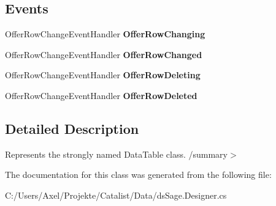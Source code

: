 \subsection*{Events}
\begin{DoxyCompactItemize}
\item 
Offer\+Row\+Change\+Event\+Handler {\bfseries Offer\+Row\+Changing}\hypertarget{class_products_1_1_data_1_1ds_sage_1_1_offer_data_table_aec11aca7c7bd800be51db3fc4bd370c2}{}\label{class_products_1_1_data_1_1ds_sage_1_1_offer_data_table_aec11aca7c7bd800be51db3fc4bd370c2}

\item 
Offer\+Row\+Change\+Event\+Handler {\bfseries Offer\+Row\+Changed}\hypertarget{class_products_1_1_data_1_1ds_sage_1_1_offer_data_table_a1ee914101e3ee41740189d86991a8996}{}\label{class_products_1_1_data_1_1ds_sage_1_1_offer_data_table_a1ee914101e3ee41740189d86991a8996}

\item 
Offer\+Row\+Change\+Event\+Handler {\bfseries Offer\+Row\+Deleting}\hypertarget{class_products_1_1_data_1_1ds_sage_1_1_offer_data_table_a42a0b640f7d907e891142fb1768a2b9b}{}\label{class_products_1_1_data_1_1ds_sage_1_1_offer_data_table_a42a0b640f7d907e891142fb1768a2b9b}

\item 
Offer\+Row\+Change\+Event\+Handler {\bfseries Offer\+Row\+Deleted}\hypertarget{class_products_1_1_data_1_1ds_sage_1_1_offer_data_table_a54f23f266b2e30679a45c584096d2e7a}{}\label{class_products_1_1_data_1_1ds_sage_1_1_offer_data_table_a54f23f266b2e30679a45c584096d2e7a}

\end{DoxyCompactItemize}


\subsection{Detailed Description}
Represents the strongly named Data\+Table class. /summary$>$ 

The documentation for this class was generated from the following file\+:\begin{DoxyCompactItemize}
\item 
C\+:/\+Users/\+Axel/\+Projekte/\+Catalist/\+Data/ds\+Sage.\+Designer.\+cs\end{DoxyCompactItemize}
